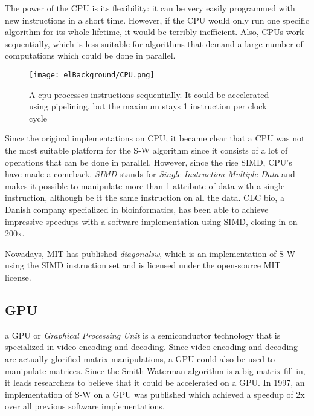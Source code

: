 The power of the CPU is its flexibility: it can be very easily programmed with new instructions in a short time. However, if the CPU would only run one specific algorithm for its whole lifetime, it would be terribly inefficient. Also, CPUs work sequentially, which is less suitable for algorithms that demand a large number of computations which could be done in parallel.

\begin{figure}[H]
	\centering
	\texttt{[image: elBackground/CPU.png]}
	\caption{A cpu processes instructions sequentially. It could be accelerated using pipelining, but the maximum stays 1 instruction per clock cycle}
	\label{fig:cpu}
\end{figure}

Since the original implementations on CPU, it became clear that a CPU was not the most suitable platform for the S-W algorithm since it consists of a lot of operations that can be done in parallel. However, since the rise SIMD, CPU's have made a comeback. \emph{SIMD} stands for \emph{Single Instruction Multiple Data} and makes it possible to manipulate more than 1 attribute of data with a single instruction, although be it the same instruction on all the data. CLC bio, a Danish company specialized in bioinformatics, has been able to achieve impressive speedups with a software implementation using SIMD, closing in on 200x.

Nowadays, MIT has published \emph{diagonalsw}, which is an implementation of S-W using the SIMD instruction set and is licensed under the open-source MIT license.

\subsection{GPU}

a GPU or \emph{Graphical Processing Unit} is a semiconductor technology that is specialized in video encoding and decoding. Since video encoding and decoding are actually glorified matrix manipulations, a GPU could also be used to manipulate matrices. Since the Smith-Waterman algorithm is a big matrix fill in, it leads researchers to believe that it could be accelerated on a GPU. In 1997, an implementation of S-W on a GPU was published %
which achieved a speedup of 2x over all previous software implementations.

